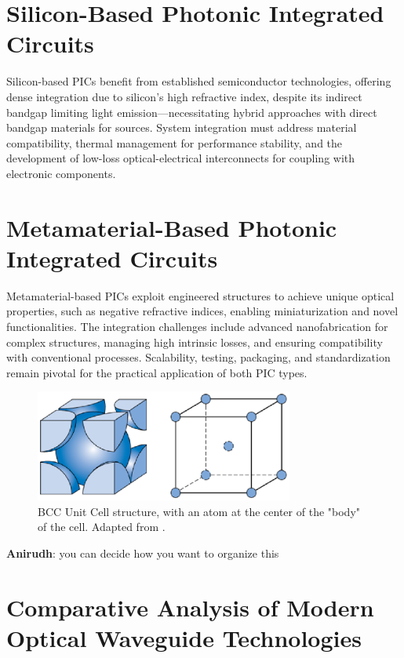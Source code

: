 \documentclass[10pt]{article}
\begin{document}
\section*{Silicon-Based Photonic Integrated Circuits}

Silicon-based PICs benefit from established semiconductor technologies, offering dense integration due to silicon's high refractive index, despite its indirect bandgap limiting light emission—necessitating hybrid approaches with direct bandgap materials for sources. System integration must address material compatibility, thermal management for performance stability, and the development of low-loss optical-electrical interconnects for coupling with electronic components.

\section*{Metamaterial-Based Photonic Integrated Circuits}

Metamaterial-based PICs exploit engineered structures to achieve unique optical properties, such as negative refractive indices, enabling miniaturization and novel functionalities. The integration challenges include advanced nanofabrication for complex structures, managing high intrinsic losses, and ensuring compatibility with conventional processes. Scalability, testing, packaging, and standardization remain pivotal for the practical application of both PIC types.


\begin{figure}[h]
    \centering
    \includegraphics[width=8.5cm]{fig1.eps}
    \caption{\label{tab1}BCC Unit Cell structure, with an atom at the center of the "body" of the cell. Adapted from \cite{ref01}.} 
    \end{figure}

\textbf{Anirudh}: you can decide how you want to organize this 

\section{Comparative Analysis of Modern Optical Waveguide Technologies}
\end{document}
